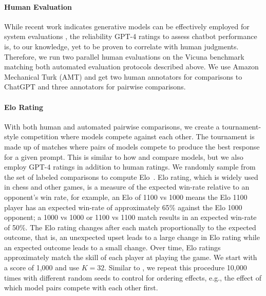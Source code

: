\paragraph{Human Evaluation} While recent work indicates generative models can be effectively employed for system evaluations \citep{fu2023gptscore}, the reliability GPT-4 ratings to assess chatbot performance is, to our knowledge, yet to be proven to correlate with human judgments. Therefore, we run two parallel human evaluations on the Vicuna benchmark matching both automated evaluation protocols described above. We use Amazon Mechanical Turk (AMT) and get two human annotators for comparisons to ChatGPT and three annotators for pairwise comparisons. 

\paragraph{Elo Rating} With both human and automated pairwise comparisons, we create a tournament-style competition where models compete against each other. The tournament is made up of matches where pairs of models compete to produce the best response for a given prompt. This is similar to how \citet{bai2022training} and \citet{vicuna2023} compare models, but we also employ GPT-4 ratings in addition to human ratings. We randomly sample from the set of labeled comparisons to compute Elo~\citep{elo1967proposed,elo1978rating}. Elo rating, which is widely used in chess and other games, is a measure of the expected win-rate relative to an opponent's win rate, for example, an Elo of 1100 vs 1000 means the Elo 1100 player has an expected win-rate of approximately 65\% against the Elo 1000 opponent; a 1000 vs 1000 or 1100 vs 1100 match results in an expected win-rate of 50\%. The Elo rating changes after each match proportionally to the expected outcome, that is, an unexpected upset leads to a large change in Elo rating while an expected outcome leads to a small change. Over time, Elo ratings approximately match the skill of each player at playing the game. We start with a score of 1,000 and use $K=32$. Similar to \citet{vicuna2023}, we repeat this procedure 10,000 times with different random seeds to control for ordering effects, e.g., the effect of which model pairs compete with each other first.

